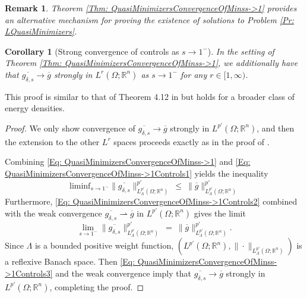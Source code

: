 \documentclass[11pt, reqno]{amsart}   	%
\theoremstyle{plain}
\numberwithin{equation}{section}
\newtheorem{corollary}[thm]{Corollary}
\newtheorem{remark}[thm]{Remark}
\def\de{\delta}
\def\La{\Lambda}
\def\Om{\Omega}
\def\R{\mathbb{R}}
\def\liminf{\text{liminf}}
\begin{document}
 \begin{remark}\label{Rmk: AltExistenceQuasiMins}
    Theorem \ref{Thm: QuasiMinimizersConvergenceOfMinss->1} provides an alternative mechanism for proving the existence of solutions to Problem \ref{Pr: LQuasiMinimizers}.
\end{remark}

\begin{corollary}[Strong convergence of controls as $s \rightarrow 1^-$]\label{Cor: QuasiMinimizersConvergenceOfMinss->1Controls}
    In the setting of Theorem \ref{Thm: QuasiMinimizersConvergenceOfMinss->1}, we additionally have that $\overline{g_{\de, s}} \rightarrow \overline{g}$ strongly in $L^r(\Om; \R^n)$ as $s \rightarrow 1^-$ for any $r \in [1, \infty)$.
\end{corollary}

This proof is similar to that of Theorem 4.12 in \cite{cueto2026localization} but holds for a broader class of energy densities.

\begin{proof}
We only show convergence of  $\overline{g_{\de, s}} \rightarrow \overline{g}$ strongly in $L^{p'}(\Om; \R^n)$, and then the extension to the other $L^r$ spaces proceeds exactly as in the proof of \cite[Theorem 4.12]{cueto2026localization}.

    Combining \eqref{Eq: QuasiMinimizersConvergenceOfMinss->1} and \eqref{Eq: QuasiMinimizersConvergenceOfMinss->1Controls1} yields the inequality
    \begin{equation}\label{Eq: QuasiMinimizersConvergenceOfMinss->1Controls2}
        \liminf_{s \rightarrow 1^-}\|\overline{g_{\de, s}}\|^{p'}_{L^{p'}_{\La}(\Om; \R^n)} \ \leq \ \|\overline{g}\|^{p'}_{L^{p'}_{\La}(\Om; \R^n)}
    \end{equation}
    Furthermore, \eqref{Eq: QuasiMinimizersConvergenceOfMinss->1Controls2} combined with the weak convergence $\overline{g_{\de, s}} \rightharpoonup \overline{g}$ in $L^{p'}(\Om; \R^n)$ gives the limit 
    \begin{equation}\label{Eq: QuasiMinimizersConvergenceOfMinss->1Controls3}
        \lim_{s \rightarrow 1^-}\|\overline{g_{\de, s}}\|^{p'}_{L^{p'}_{\La}(\Om; \R^n)} \ = \ \|\overline{g}\|^{p'}_{L^{p'}_{\La}(\Om; \R^n)}.
    \end{equation}
    Since $\La$ is a bounded positive weight function, $(L^{p'}(\Om; \R^n), \|\cdot\|_{L^{p'}_{\La}(\Om; \R^n)})$ is a reflexive Banach space. Then \eqref{Eq: QuasiMinimizersConvergenceOfMinss->1Controls3} and the weak convergence imply that $\overline{g_{\de, s}} \rightarrow \overline{g}$ strongly in $L^{p'}(\Om; \R^n)$, completing the proof.
\end{proof}
\end{document}
